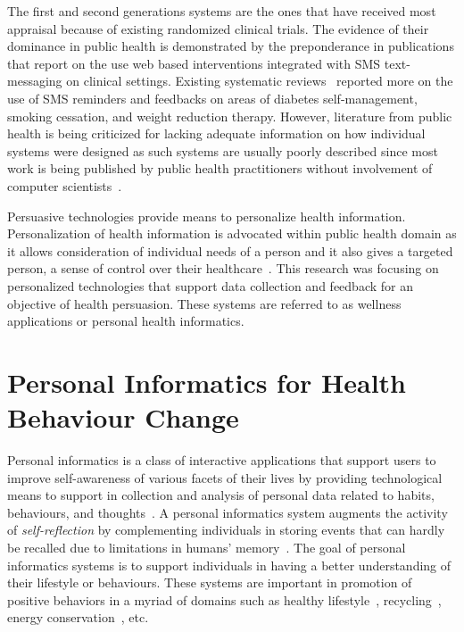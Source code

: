 The first and second generations systems are the ones that have received most appraisal because of existing randomized clinical trials. The evidence of their dominance in public health is demonstrated by the preponderance in publications that report on the use web based interventions integrated with SMS text-messaging on clinical settings. Existing systematic reviews~\citep{cole2010text,fjeldsoe2009behavior,krishna2009healthcare} reported more on the use of SMS reminders and feedbacks on areas of diabetes self-management, smoking cessation, and weight reduction therapy. However, literature from public health is being criticized for lacking adequate information on how individual systems were designed as such systems are usually poorly described since most work is being published by public health practitioners without involvement of computer scientists~\citep{Oinas-Kukkonen:foundation}.

Persuasive technologies provide means to personalize health information. Personalization of health information is advocated within public health domain as it allows consideration of individual needs of a person and it also gives a targeted person, a  sense of control over their healthcare~\citep{mccallum2012gamification}. This research was focusing on personalized technologies that support data collection and feedback for an objective of health persuasion. These systems are referred to as wellness applications or personal health informatics. 
\section{Personal Informatics for Health Behaviour Change}
Personal informatics is a class of interactive applications that support users to improve self-awareness of various facets of their lives by providing technological means to support in collection and analysis of personal data related to habits, behaviours, and thoughts~\citep{li2011personal,li2012personal}. A personal informatics system augments the activity of \emph{self-reflection} by complementing individuals in storing events that can hardly be recalled due to limitations in humans' memory~\citep{li2010stage}. The goal of personal informatics systems is to support individuals in having a better understanding of their lifestyle or behaviours. These systems are important in promotion of positive behaviors in a myriad of domains such as healthy lifestyle~\citep{korhonen2010personal}, recycling~\citep{comber2013designing}, energy conservation~\citep{seligman1977feedback}, etc. 

